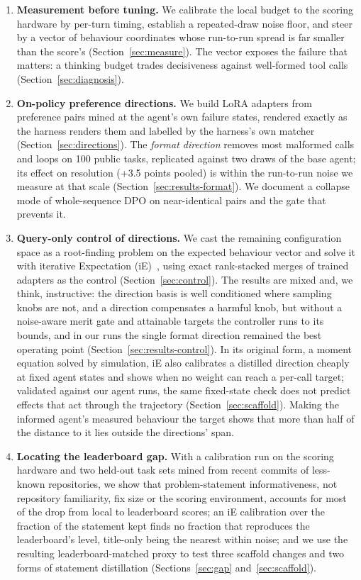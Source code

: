 \documentclass[11pt]{article}
\begin{document}
\begin{enumerate}
  \item \textbf{Measurement before tuning.} We calibrate the local budget to the scoring hardware by per-turn timing, establish a repeated-draw noise floor, and steer by a vector of behaviour coordinates whose run-to-run spread is far smaller than the score's (Section~\ref{sec:measure}). The vector exposes the failure that matters: a thinking budget trades decisiveness against well-formed tool calls (Section~\ref{sec:diagnosis}).
  \item \textbf{On-policy preference directions.} We build LoRA adapters from preference pairs mined at the agent's own failure states, rendered exactly as the harness renders them and labelled by the harness's own matcher (Section~\ref{sec:directions}). The \emph{format direction} removes most malformed calls and loops on 100 public tasks, replicated against two draws of the base agent; its effect on resolution (+3.5 points pooled) is within the run-to-run noise we measure at that scale (Section~\ref{sec:results-format}). We document a collapse mode of whole-sequence DPO on near-identical pairs and the gate that prevents it.
  \item \textbf{Query-only control of directions.} We cast the remaining configuration space as a root-finding problem on the expected behaviour vector and solve it with iterative Expectation (iE)~\citep{qin2025ie}, using exact rank-stacked merges of trained adapters as the control (Section~\ref{sec:control}). The results are mixed and, we think, instructive: the direction basis is well conditioned where sampling knobs are not, and a direction compensates a harmful knob, but without a noise-aware merit gate and attainable targets the controller runs to its bounds, and in our runs the single format direction remained the best operating point (Section~\ref{sec:results-control}). In its original form, a moment equation solved by simulation, iE also calibrates a distilled direction cheaply at fixed agent states and shows when no weight can reach a per-call target; validated against our agent runs, the same fixed-state check does not predict effects that act through the trajectory (Section~\ref{sec:scaffold}). Making the informed agent's measured behaviour the target shows that more than half of the distance to it lies outside the directions' span.
  \item \textbf{Locating the leaderboard gap.} With a calibration run on the scoring hardware and two held-out task sets mined from recent commits of less-known repositories, we show that problem-statement informativeness, not repository familiarity, fix size or the scoring environment, accounts for most of the drop from local to leaderboard scores; an iE calibration over the fraction of the statement kept finds no fraction that reproduces the leaderboard's level, title-only being the nearest within noise; and we use the resulting leaderboard-matched proxy to test three scaffold changes and two forms of statement distillation (Sections~\ref{sec:gap} and~\ref{sec:scaffold}).
\end{enumerate}
\end{document}
